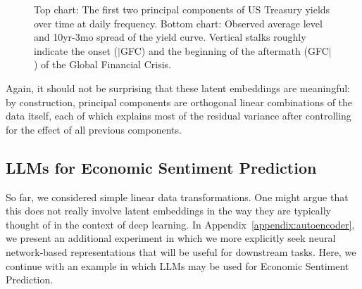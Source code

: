 \begin{figure}[tb]


\caption{\label{fig-pca-yield}Top chart: The first two principal components of US Treasury yields over time at daily frequency. Bottom chart: Observed average level and 10yr-3mo spread of the yield curve. Vertical stalks roughly indicate the onset ($|$GFC) and the beginning of the aftermath (GFC$|$) of the Global Financial Crisis.}

\end{figure}%

Again, it should not be surprising that these latent embeddings are meaningful: by construction, principal components are orthogonal linear combinations of the data itself, each of which explains most of the residual variance after controlling for the effect of all previous components.

\subsection{LLMs for Economic Sentiment Prediction}\label{ex-llm}

So far, we considered simple linear data transformations. One might argue that this does not really involve latent embeddings in the way they are typically thought of in the context of deep learning. In Appendix~\ref{appendix:autoencoder}, we present an additional experiment in which we more explicitly seek neural network-based representations that will be useful for downstream tasks. Here, we continue with an example in which LLMs may be used for Economic Sentiment Prediction.

